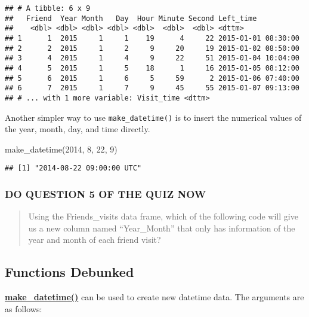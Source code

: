 \documentclass[
]{book}
\newenvironment{Shaded}{\begin{snugshade}}{\end{snugshade}}
\newcommand{\DecValTok}[1]{\textcolor[rgb]{0.00,0.00,0.81}{#1}}
\newcommand{\FunctionTok}[1]{\textcolor[rgb]{0.00,0.00,0.00}{#1}}
\newcommand{\NormalTok}[1]{#1}
\begin{document}
\begin{verbatim}
## # A tibble: 6 x 9
##   Friend  Year Month   Day  Hour Minute Second Left_time          
##    <dbl> <dbl> <dbl> <dbl> <dbl>  <dbl>  <dbl> <dttm>             
## 1      1  2015     1     1    19      4     22 2015-01-01 08:30:00
## 2      2  2015     1     2     9     20     19 2015-01-02 08:50:00
## 3      4  2015     1     4     9     22     51 2015-01-04 10:04:00
## 4      5  2015     1     5    18      1     16 2015-01-05 08:12:00
## 5      6  2015     1     6     5     59      2 2015-01-06 07:40:00
## 6      7  2015     1     7     9     45     55 2015-01-07 09:13:00
## # ... with 1 more variable: Visit_time <dttm>
\end{verbatim}

Another simpler way to use \texttt{make\_datetime()} is to insert the numerical values of the year, month, day, and time directly.

\begin{Shaded}
\begin{Highlighting}[]
\FunctionTok{make\_datetime}\NormalTok{(}\DecValTok{2014}\NormalTok{, }\DecValTok{8}\NormalTok{, }\DecValTok{22}\NormalTok{, }\DecValTok{9}\NormalTok{)}
\end{Highlighting}
\end{Shaded}

\begin{verbatim}
## [1] "2014-08-22 09:00:00 UTC"
\end{verbatim}

\hypertarget{do-question-5-of-the-quiz-now-3}{%
\subsubsection{DO QUESTION 5 OF THE QUIZ NOW}\label{do-question-5-of-the-quiz-now-3}}

\begin{quote}
Using the Friends\_visits data frame, which of the following code will give us a new column named ``Year\_Month'' that only has information of the year and month of each friend visit?
\end{quote}

\hypertarget{functions-debunked-22}{%
\subsection{Functions Debunked}\label{functions-debunked-22}}

\textbf{\href{https://lubridate.tidyverse.org/reference/make_datetime.html}{make\_datetime()}} can be used to create new datetime data. The arguments are as follows:
\end{document}
